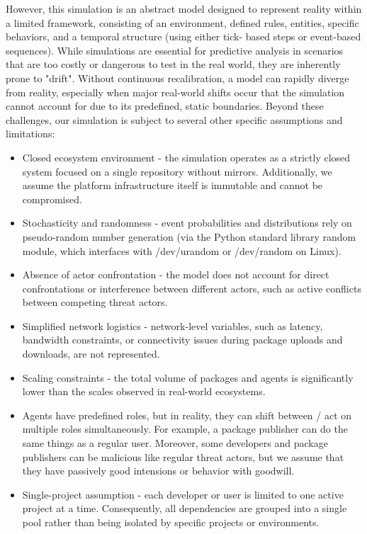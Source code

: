 However, this simulation is an abstract model designed to represent reality within a limited framework, consisting of an environment, defined rules, entities, specific behaviors, and a temporal structure (using either tick- based steps or event-based sequences). While simulations are essential for predictive analysis in scenarios that are too costly or dangerous to test in the real world, they are inherently prone to "drift". Without continuous recalibration, a model can rapidly diverge from reality, especially when major real-world shifts occur that the simulation cannot account for due to its predefined, static boundaries. Beyond these challenges, our simulation is subject to several other specific assumptions and limitations:
\begin{itemize}
    \item Closed ecosystem environment - the simulation operates as a strictly closed system focused on a single repository without mirrors. Additionally, we assume the platform infrastructure itself is immutable and cannot be compromised.
    \item Stochasticity and randomness - event probabilities and distributions rely on pseudo-random number generation (via the Python standard library random module, which interfaces with /dev/urandom or /dev/random on Linux).
    \item Absence of actor confrontation - the model does not account for direct confrontations or interference between different actors, such as active conflicts between competing threat actors.
    \item Simplified network logistics - network-level variables, such as latency, bandwidth constraints, or connectivity issues during package uploads and downloads, are not represented.
    \item Scaling constraints - the total volume of packages and agents is significantly lower than the scales observed in real-world ecosystems.
    \item Agents have predefined roles, but in reality, they can shift between / act on multiple roles simultaneously. For example, a package publisher can do the same things as a regular user. Moreover, some developers and package publishers can be malicious like regular threat actors, but we assume that they have passively good intensions or behavior with goodwill.
    \item Single-project assumption - each developer or user is limited to one active project at a time. Consequently, all dependencies are grouped into a single pool rather than being isolated by specific projects or environments.

\end{itemize}
